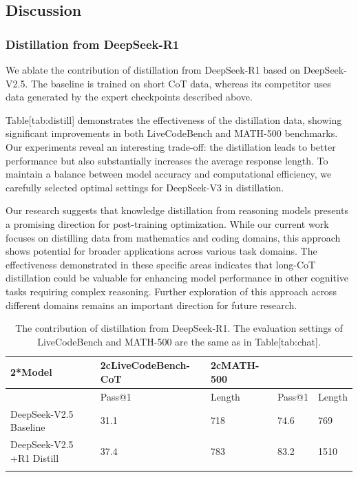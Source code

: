 \documentclass[11pt,a4paper]{article}
\begin{document}
\subsection{Discussion}

\subsubsection{Distillation from DeepSeek-R1}

We ablate the contribution of distillation from DeepSeek-R1 based on DeepSeek-V2.5. The baseline is trained on short CoT data, whereas its competitor uses data generated by the expert checkpoints described above.

Table[tab:distill] demonstrates the effectiveness of the distillation data, showing significant improvements in both LiveCodeBench and MATH-500 benchmarks. Our experiments reveal an interesting trade-off: the distillation leads to better performance but also substantially increases the average response length. To maintain a balance between model accuracy and computational efficiency, we carefully selected optimal settings for DeepSeek-V3 in distillation.

Our research suggests that knowledge distillation from reasoning models presents a promising direction for post-training optimization. While our current work focuses on distilling data from mathematics and coding domains, this approach shows potential for broader applications across various task domains. The effectiveness demonstrated in these specific areas indicates that long-CoT distillation could be valuable for enhancing model performance in other cognitive tasks requiring complex reasoning. Further exploration of this approach across different domains remains an important direction for future research.

\begin{table}[h]
\caption{The contribution of distillation from DeepSeek-R1. The evaluation settings of LiveCodeBench and MATH-500 are the same as in Table[tab:chat].}
\begin{tabular}{|l|l|l|l|l|}
\hline
2*Model & 2cLiveCodeBench-CoT & 2cMATH-500 &  &  \\ \hline
 & Pass@1 & Length & Pass@1 & Length \\ \hline
DeepSeek-V2.5 Baseline & 31.1 & 718 & 74.6 & 769 \\ \hline
DeepSeek-V2.5 +R1 Distill & 37.4 & 783 & 83.2 & 1510 \\ \hline
 &  &  &  &  \\ \hline
\end{tabular}
\end{table}
\end{document}
